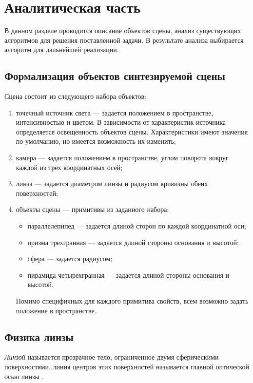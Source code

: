 \section{Аналитическая часть}

В данном разделе проводится описание объектов сцены, анализ существующих алгоритмов для решения поставленной задачи. В результате анализа выбирается алгоритм для дальнейшей реализации.

\subsection{Формализация объектов синтезируемой сцены}

Сцена состоит из следующего набора объектов:

\begin{enumerate}
	\item точечный источник света --- задается положением в пространстве, интенсивностью и цветом. В зависимости от характеристик источника определяется освещенность объектов сцены. Характеристики имеют значения по умолчанию, но имеется возможность их изменить;
	\item камера --- задается положением в пространстве, углом поворота вокруг каждой из трех координатных осей;
	\item линза --- задается диаметром линзы и радиусом кривизны обеих поверхностей;
	\item объекты сцены --- примитивы из заданного набора: 
	\begin{itemize}
		\item параллелепипед --- задается длиной сторон по каждой координатной оси;
		\item призма трехгранная --- задается длиной стороны основания и высотой;
		\item сфера --- задается радиусом;
		\item пирамида четырехгранная --- задается длиной стороны основания и высотой.
	\end{itemize}
	Помимо специфичных для каждого примитива свойств, всем возможно задать положение в пространстве.
\end{enumerate}

\subsection{Физика линзы}

\textit{Линзой} называется прозрачное тело, ограниченное двумя сферическими поверхностями, линия центров этих поверхностей называется главной оптической осью линзы \cite{msu_optic}.

